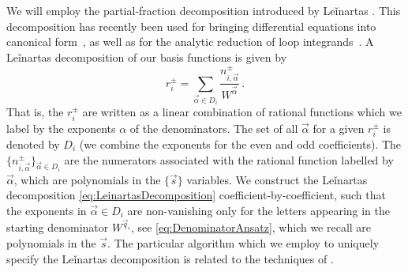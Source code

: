 We will employ the partial-fraction decomposition introduced by
Leǐnartas \cite{leinartas1978factorization,raichev2012leinartas}.
This decomposition has recently been used for bringing differential equations into
canonical form~\cite{Meyer:2016slj}, as well as for the
analytic reduction of loop integrands~\cite{Zhang:2012ce, Mastrolia:2012an}.
A Leǐnartas decomposition of our basis functions is given by
\begin{equation}
    r_i^{\pm} = \sum_{\vec\alpha \in D_i} \frac{n^{\pm}_{i,\vec\alpha}}{ 
	W^{\vec\alpha} }\,.
    \label{eq:LeinartasDecomposition}
\end{equation}
That is, the $r_i^{\pm}$ are written as a linear combination of rational
functions which we label by the exponents $\alpha$ of the denominators.
The set of all $\vec\alpha$ for a given $r_i^{\pm}$ is denoted by $D_i$ (we combine
the exponents for the even and odd coefficients). The 
$\{n_{i,\vec\alpha}^\pm \}_{\vec\alpha\in D_i}$ are the numerators associated
with the rational function labelled by $\vec\alpha$,
which are polynomials in the $\{\vec s\}$ variables.
We construct the Leǐnartas decomposition 
\eqref{eq:LeinartasDecomposition} coefficient-by-coefficient, such that the exponents in 
$\vec\alpha\in D_i$ are non-vanishing only for the letters appearing 
in the starting denominator $W^{\vec q_i}$, see \cref{eq:DenominatorAnsatz}, 
which we recall are polynomials in the $\vec s$.
The particular algorithm which we employ to uniquely specify the 
Leǐnartas decomposition is related to the techniques 
of \cite{Smirnov:2005ky}.

